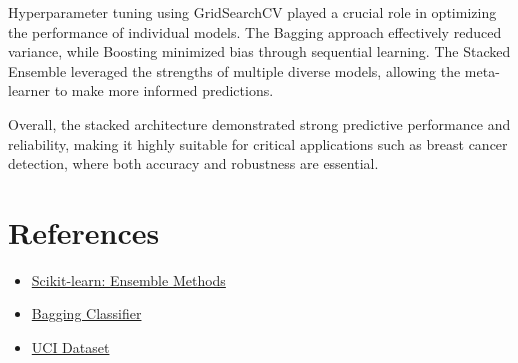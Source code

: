\documentclass[11pt]{article}
\begin{document}
Hyperparameter tuning using GridSearchCV played a crucial role in optimizing the performance of individual models. The Bagging approach effectively reduced variance, while Boosting minimized bias through sequential learning. The Stacked Ensemble leveraged the strengths of multiple diverse models, allowing the meta-learner to make more informed predictions.

Overall, the stacked architecture demonstrated strong predictive performance and reliability, making it highly suitable for critical applications such as breast cancer detection, where both accuracy and robustness are essential.


\section*{References}
\begin{itemize}
    \item \href{https://scikit-learn.org/stable/modules/ensemble.html}{Scikit-learn: Ensemble Methods}
    \item \href{https://scikit-learn.org/stable/modules/generated/sklearn.ensemble.BaggingClassifier.html}{Bagging Classifier}
    \item \href{https://archive.ics.uci.edu/dataset/17/breast+cancer+wisconsin+diagnostic}{UCI Dataset}
\end{itemize}
\end{document}
